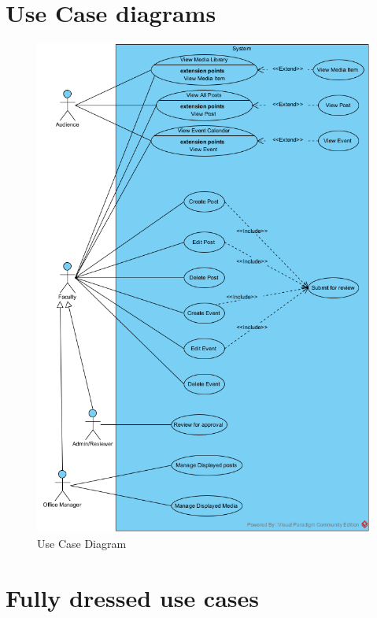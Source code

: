 \documentclass{article}
\begin{document}
\section{Use Case diagrams}
\begin{figure}[H]
    \centering
    \includegraphics[scale=0.8]{images/UCD.png}
    \caption{Use Case Diagram}
    \label{fig:enter-label}
\end{figure}
\section{Fully dressed use cases}
\end{document}
